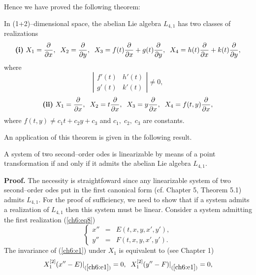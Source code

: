 Hence we have proved the following theorem:
\begin{theo} 
\label{ch6:theo1}
\begin{em}
In (1+2)--dimensional space, the abelian Lie algebra $L_{4,1}$ has two classes
of realizations\\
\begin{equation}
\mbox{{\bf(i)} } X_1=\frac{\partial}{\partial x},\;\; 
X_2=\frac{\partial}{\partial y},\;\;
X_3=f(t)\frac{\partial }{\partial x}+g(t)\frac{\partial}{\partial y},\;\;
X_4=h(t)\frac{\partial }{\partial x}+k(t)\frac{\partial}{\partial y},
\label{ch6:eq8}
\end{equation}
where
\[\left | \begin{array}{cc}
f'(t) & h'(t) \\
g'(t) &  k'(t) 
\end{array} \right |\ne 0,\]
\begin{equation}
\mbox{{\bf (ii)} }X_1=\frac{\partial}{\partial x},\;\;
X_2=t\frac{\partial}{\partial x},\;\;X_3=y\frac{\partial}{\partial x},\;\;
X_4=f(t,y)\frac{\partial}{\partial x},
\label{ch6:eq9}
\end{equation}
where $f(t,y)\ne c_1t+c_2y+c_3$ and $c_1,\;c_2,\;c_3$ are constants.
\end{em}
\end{theo}
An application of this theorem is given in the following result.
\begin{theo}
\label{ch6:theo2}
\begin{em}
A system of two second--order odes is linearizable by means of a point
transformation if and only if it admits the abelian Lie algebra $L_{4,1}$.
\end{em}
\end{theo}
{\bf Proof.} The necessity is straightfoward since any linearizable 
system of two second--order odes  put in the first canonical form
(cf. Chapter 5, Theorem 5.1) admits $L_{4,1}$. For the proof of sufficiency,
we need
to show that  if a system admits a realization of $L_{4,1}$ then this system 
must be linear. Consider a system admitting the first realization
(\ref{ch6:eq8})
\begin{equation}
\label{ch6:e1}
\left \{ \begin{array}{ccc} x'' &=&E(t,x,y,x',y'),\\ y''&=&F(t,x,y,x',y'). 
\end{array} \right.
\end{equation}
The invariance of (\ref{ch6:e1}) under $X_1$ is equivalent to (see Chapter 1)
\[X_1^{[2]}(x''-E)|_{(\ref{ch6:e1})}=0,\;\;X_1^{[2]}(y''-F)|_{(\ref{ch6:e1})}=0,\]

